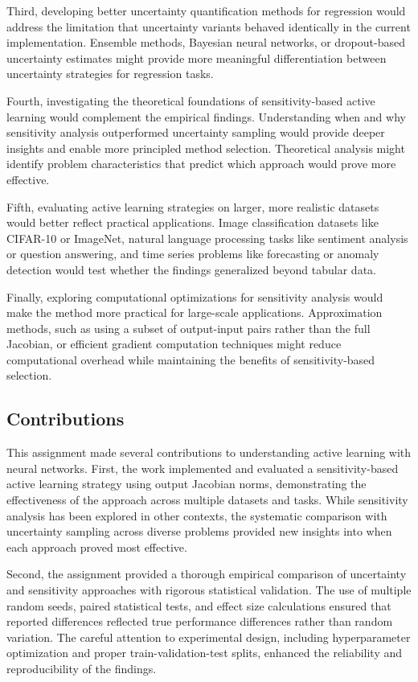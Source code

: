 \documentclass[conference]{IEEEtran}
\begin{document}
Third, developing better uncertainty quantification methods for regression would address the limitation that uncertainty variants behaved identically in the current implementation. Ensemble methods, Bayesian neural networks, or dropout-based uncertainty estimates might provide more meaningful differentiation between uncertainty strategies for regression tasks.

Fourth, investigating the theoretical foundations of sensitivity-based active learning would complement the empirical findings. Understanding when and why sensitivity analysis outperformed uncertainty sampling would provide deeper insights and enable more principled method selection. Theoretical analysis might identify problem characteristics that predict which approach would prove more effective.

Fifth, evaluating active learning strategies on larger, more realistic datasets would better reflect practical applications. Image classification datasets like CIFAR-10 or ImageNet, natural language processing tasks like sentiment analysis or question answering, and time series problems like forecasting or anomaly detection would test whether the findings generalized beyond tabular data.

Finally, exploring computational optimizations for sensitivity analysis would make the method more practical for large-scale applications. Approximation methods, such as using a subset of output-input pairs rather than the full Jacobian, or efficient gradient computation techniques might reduce computational overhead while maintaining the benefits of sensitivity-based selection.

\subsection{Contributions}

This assignment made several contributions to understanding active learning with neural networks. First, the work implemented and evaluated a sensitivity-based active learning strategy using output Jacobian norms, demonstrating the effectiveness of the approach across multiple datasets and tasks. While sensitivity analysis has been explored in other contexts, the systematic comparison with uncertainty sampling across diverse problems provided new insights into when each approach proved most effective.

Second, the assignment provided a thorough empirical comparison of uncertainty and sensitivity approaches with rigorous statistical validation. The use of multiple random seeds, paired statistical tests, and effect size calculations ensured that reported differences reflected true performance differences rather than random variation. The careful attention to experimental design, including hyperparameter optimization and proper train-validation-test splits, enhanced the reliability and reproducibility of the findings.
\end{document}
